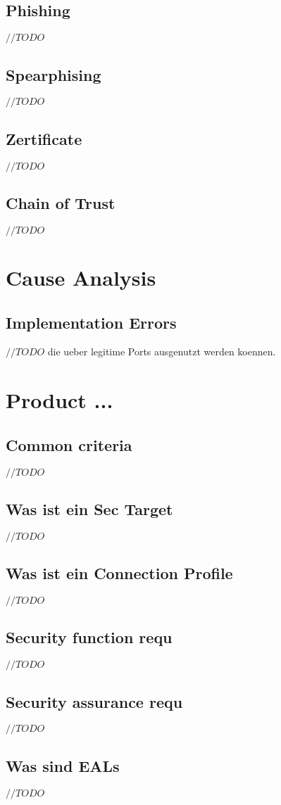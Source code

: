 \documentclass[a4paper, 12pt]{article}
\begin{document}
\subsection{Phishing}
$ //TODO $
\subsection{Spearphising}
$ //TODO $
\subsection{Zertificate}
$ //TODO $
\subsection{Chain of Trust}
$ //TODO $

\section{Cause Analysis}
\subsection{Implementation Errors}
$ //TODO $
die ueber legitime Ports ausgenutzt werden koennen.

\section{Product ...}
\subsection{Common criteria}
$ //TODO $
\subsection{Was ist ein Sec Target}
$ //TODO $
\subsection{Was ist ein Connection Profile}
$ //TODO $
\subsection{Security function requ}
$ //TODO $
\subsection{Security assurance requ}
$ //TODO $
\subsection{Was sind EALs}
$ //TODO $
\end{document}
